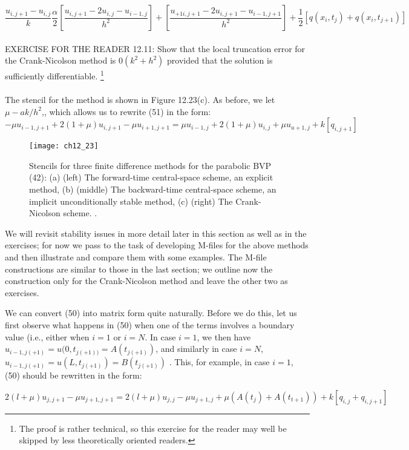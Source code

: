\documentclass[../main.tex]{subfiles}
\begin{document}
\begin{equation}\dfrac{u_{i,j+1}-u_{i,j}}{k}
\dfrac{\alpha}{2}[\dfrac{u_{i,j+1}-2u_{i,j}-u_{i-1,j}}{h^2}]
+[\dfrac{u_{+1i,j+1}-2u_{i,j+1}-u_{i-1,j+1}}{h^2}]
 +\dfrac{1}{2}[q(x_i,t_j)+q(x_i,t_{j+1})]
\end{equation}
\\
EXERCISE FOR THE READER 12.11: Show that the local truncation error for the Crank-Nicolson method is $0(k^2 +h^2)$ provided that the solution is sufficiently differentiable.
\footnote{The proof is rather technical, so this exercise for the reader may well be skipped by less theoretically 
oriented readers.}
\\
\\
The stencil for the method is shown in Figure 12.23(c). As before, we let  $\mu- ak/h^2$,, which allows us to rewrite (51) in the form:
\begin{equation}
-\mu u_{i-1,j+1}+2(1+\mu)u_{i,j+1}-\mu u_{i+1,j+1}=
\mu u_{i-1,j}+2(1+\mu)u_{i,j}+\mu u_{u+1,j}+k[q_{i,j+1}]
\end{equation}

\begin{figure}[H]
	\centering
	\texttt{[image: ch12\_23]}
	\caption{\textsf{Stencils for three finite difference methods for the parabolic BVP (42): (a) (left) The forward-time central-space scheme, an explicit method, (b) (middle) The backward-time central-space scheme, an implicit unconditionally stable method, (c) (right) The Crank-Nicolson scheme. .}}
	\label{pfig:ch12_23}
\end{figure}

We will revisit stability issues in more detail later in this section as well as in the exercises; for now we pass to the task of developing M-files for the above methods and then illustrate and compare them with some examples. The M-file constructions are similar to those in the last section; we outline now the construction only for the Crank-Nicolson method and leave the other two as exercises.


We can convert (50) into matrix form quite naturally. Before we do this, let us first observe what happens in (50) when one of the terms involves a boundary value (i.e., either when $i = 1$ or $i = N$. In case $i = 1$, we then have $u_{i-1,j(+1)}=u(0,t_{j(+1))}=A(t_{j(+1)})$, and similarly in case $i = N$, $u_{i-1,j(+1)}=u(L,t_{j(+1)})=B(t_{j(+1)})$ . This, for example, in case $i = 1$, (50) should be rewritten in the form:

$$
2(l+\mu)u_{j,j+1}-\mu u_{j+1,j+1}=
2(l+\mu)u_{j,j}-\mu u_{j+1,j}+\mu (A(t_j) +A(t_{t+1}))+k[q_{i,j}+q_{i,j+1}]
$$
\end{document}
